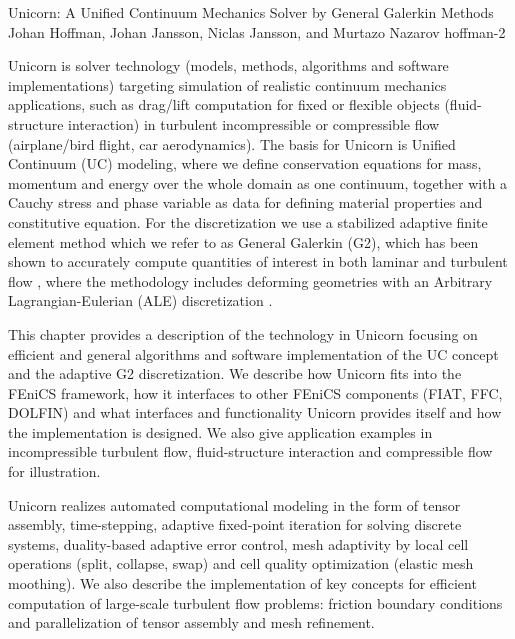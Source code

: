               {Unicorn: A Unified Continuum Mechanics Solver by General Galerkin Methods}
              {Johan Hoffman, Johan Jansson, Niclas Jansson, and Murtazo Nazarov}
              {hoffman-2}

Unicorn is solver technology (models, methods, algorithms and software
implementations) targeting simulation of realistic continuum mechanics
applications, such as drag/lift computation for fixed or flexible
objects (fluid-structure interaction) in turbulent incompressible or
compressible flow (airplane/bird flight, car aerodynamics). The basis
for Unicorn is Unified Continuum (UC) modeling, where we define
conservation equations for mass, momentum and energy over the whole
domain as one continuum, together with a Cauchy stress and phase
variable as data for defining material properties and constitutive
equation. For the discretization we use a stabilized adaptive finite
element method which we refer to as General Galerkin (G2), which has
been shown to accurately compute quantities of interest in both
laminar and turbulent flow
\cite{ho:siam:bb,hojo:cmame:special,ho:sp,ho:cc,ho:sp,ho:scm}, where
the methodology includes deforming geometries with an Arbitrary
Lagrangian-Eulerian (ALE) discretization \cite{Hoffman_2009,
jjan:fsipre}.

This chapter provides a description of the technology in Unicorn
focusing on efficient and general algorithms and software
implementation of the UC concept and the adaptive G2
discretization. We describe how Unicorn fits into the FEniCS
framework, how it interfaces to other FEniCS components (FIAT, FFC,
DOLFIN) and what interfaces and functionality Unicorn provides itself
and how the implementation is designed. We also give application
examples in incompressible turbulent flow, fluid-structure interaction
and compressible flow for illustration.

Unicorn realizes automated computational modeling in the form of
tensor assembly, time-stepping, adaptive fixed-point iteration for
solving discrete systems, duality-based adaptive error control, mesh
adaptivity by local cell operations (split, collapse, swap) and cell
quality optimization (elastic mesh moothing). We also describe the
implementation of key concepts for efficient computation of
large-scale turbulent flow problems: friction boundary conditions and
parallelization of tensor assembly and mesh refinement.


